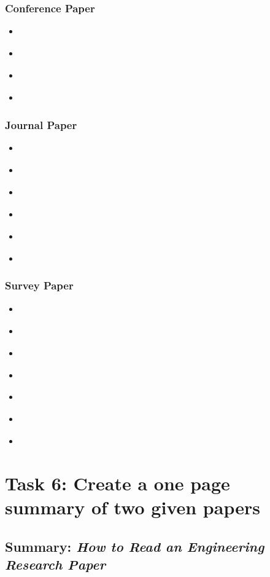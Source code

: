 \documentclass{article}
\begin{document}
  \subsubsection*{Conference Paper}
  \begin{itemize}
    \item \cite{Schneider2003}
    \item \cite{Liang2014}
    \item \cite{Liu2006}
    \item \cite{Hameed2018}
  \end{itemize}

  \subsubsection*{Journal Paper}
   \begin{itemize}
    \item \cite{Innocente2019}
    \item \cite{Osaba2020}
    \item \cite{Alshawi2017}
    \item \cite{Vigelius2014}
    \item \cite{Mirzaei2020}
    \item \cite{CORTES2017}
  \end{itemize}

   \subsubsection*{Survey Paper}
   \begin{itemize}
    \item \cite{Chung2018}
    \item \cite{Mavrovouniotis2017}
    \item \cite{Derrac2011}
    \item \cite{Shi2012}
    \item \cite{Miner2007}
    \item \cite{CORTES2017}
    \item \cite{Vasconez2019}
  \end{itemize}


  \section*{Task 6: Create a one page summary of two given papers}
  \subsection*{Summary: \emph{How to Read an Engineering Research Paper}}
  
\end{document}
